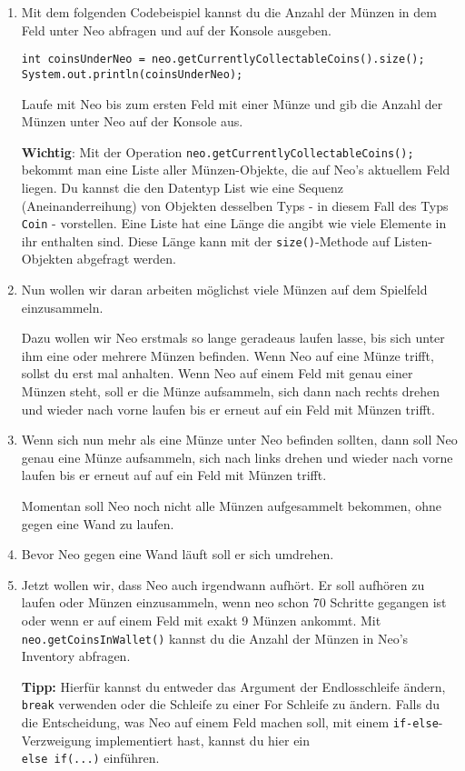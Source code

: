 
\begin{enumerate}
	\item
		Mit dem folgenden Codebeispiel kannst du die Anzahl der Münzen in dem Feld unter Neo abfragen und auf der Konsole ausgeben.

		\begin{lstlisting}
int coinsUnderNeo = neo.getCurrentlyCollectableCoins().size();
System.out.println(coinsUnderNeo);
		\end{lstlisting}

		Laufe mit Neo bis zum ersten Feld mit einer Münze und gib die Anzahl der Münzen unter Neo auf der Konsole aus.\newline

		\textbf{Wichtig}: Mit der Operation \lstinline{neo.getCurrentlyCollectableCoins();} bekommt man eine Liste aller Münzen-Objekte, die auf Neo's aktuellem Feld liegen.
		Du kannst die den Datentyp List wie eine Sequenz (Aneinanderreihung) von Objekten desselben Typs - in diesem Fall des Typs \lstinline{Coin} - vorstellen.
		Eine Liste hat eine Länge die angibt wie viele Elemente in ihr enthalten sind.
		Diese Länge kann mit der \lstinline{size()}-Methode auf Listen-Objekten abgefragt werden.

	\item
	 	Nun wollen wir daran arbeiten möglichst viele Münzen auf dem Spielfeld einzusammeln.

		Dazu wollen wir Neo erstmals so lange geradeaus laufen lasse, bis sich unter ihm eine oder mehrere Münzen befinden.
		Wenn Neo auf eine Münze trifft, sollst du erst mal anhalten.
		Wenn Neo auf einem Feld mit genau einer Münzen steht, soll er die Münze aufsammeln, sich dann nach rechts drehen und wieder nach vorne laufen bis er erneut auf ein Feld mit Münzen trifft.
	\item
		Wenn sich nun mehr als eine Münze unter Neo befinden sollten, dann soll Neo genau eine Münze aufsammeln, sich nach links drehen und wieder nach vorne laufen bis er erneut auf auf ein Feld mit Münzen trifft.

		Momentan soll Neo noch nicht alle Münzen aufgesammelt bekommen, ohne gegen eine Wand zu laufen.
	\item
		Bevor Neo gegen eine Wand läuft soll er sich umdrehen.
	\item
		Jetzt wollen wir, dass Neo auch irgendwann aufhört.
		Er soll aufhören zu laufen oder Münzen einzusammeln, wenn neo schon 70 Schritte gegangen ist oder wenn er auf einem Feld mit exakt 9 Münzen ankommt.
		Mit \lstinline{neo.getCoinsInWallet()} kannst du die Anzahl der Münzen in Neo's Inventory abfragen.

		\textbf{Tipp:} Hierfür kannst du entweder das Argument der Endlosschleife ändern, \lstinline{break} verwenden oder die Schleife zu einer For Schleife zu ändern.
		Falls du die Entscheidung, was Neo auf einem Feld machen soll, mit einem \lstinline{if-else}-Verzweigung implementiert hast, kannst du hier ein\\
		\lstinline{else if(...)} einführen.
\end{enumerate}
